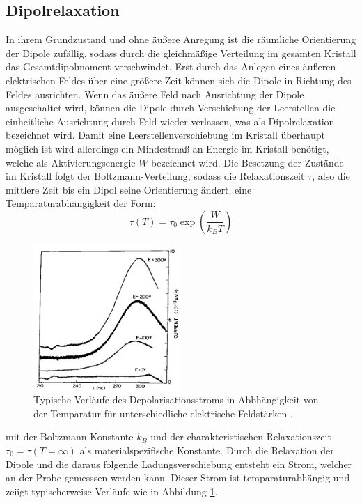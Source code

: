 \subsection{Dipolrelaxation}
In ihrem Grundzustand und ohne äußere Anregung ist die räumliche Orientierung der Dipole zufällig, sodass durch die gleichmäßige Verteilung im gesamten Kristall das Gesamtdipolmoment verschwindet. Erst durch das Anlegen eines äußeren elektrischen Feldes über eine größere Zeit können sich die Dipole in Richtung des Feldes ausrichten. Wenn das äußere Feld nach Ausrichtung der Dipole ausgeschaltet wird, können die Dipole durch Verschiebung der Leerstellen die einheitliche Ausrichtung durch Feld wieder verlassen, was als Dipolrelaxation bezeichnet wird. Damit eine Leerstellenverschiebung im Kristall überhaupt möglich ist wird allerdings ein Mindestmaß an Energie im Kristall benötigt, welche als Aktivierungsenergie $W$ bezeichnet wird. Die Besetzung der Zustände im Kristall folgt der Boltzmann-Verteilung, sodass die Relaxationszeit $\tau$, also die mittlere Zeit bis ein Dipol seine Orientierung ändert, eine Temparaturabhängigkeit der Form:
\begin{equation}
\tau(T)=\tau_0\exp\left(\frac{W}{k_BT}\right)
\end{equation}
\begin{figure}
\centering
\includegraphics[width=0.5\textwidth,keepaspectratio]{Depolarisationsstrom}
\caption{Typische Verläufe des Depolarisationsstroms in Abbhängigkeit von der Temparatur für unterschiedliche elektrische Feldstärken \cite{fuller}.}
\label{fig:Depolarisationsstrom}
\end{figure}
mit der Boltzmann-Konstante $k_B$ und der charakteristischen Relaxationszeit $\tau_0=\tau(T=\infty)$ als materialspezifische Konstante. Durch die Relaxation der Dipole und die daraus folgende Ladungsverschiebung entsteht ein Strom, welcher an der Probe gemesssen werden kann. 
Dieser Strom ist temparaturabhängig und zeiigt typischerweise Verläufe wie in Abbildung \ref{fig:Depolarisationsstrom}.
